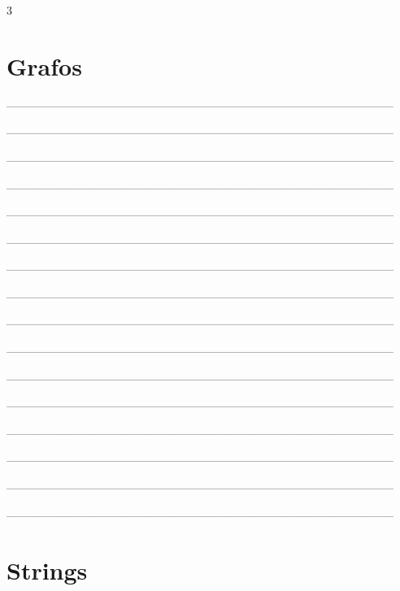 \documentclass[10pt,landscape,oneside,openany,a4paper,notitlepage]{book}
\begin{document}
\begin{multicols*}{3}
\chapter{Grafos}

------------------------------------------------------------------------------------------------------

------------------------------------------------------------------------------------------------------

------------------------------------------------------------------------------------------------------

------------------------------------------------------------------------------------------------------

------------------------------------------------------------------------------------------------------

------------------------------------------------------------------------------------------------------

------------------------------------------------------------------------------------------------------

------------------------------------------------------------------------------------------------------

------------------------------------------------------------------------------------------------------

------------------------------------------------------------------------------------------------------

------------------------------------------------------------------------------------------------------

------------------------------------------------------------------------------------------------------

------------------------------------------------------------------------------------------------------


------------------------------------------------------------------------------------------------------

------------------------------------------------------------------------------------------------------

------------------------------------------------------------------------------------------------------



\chapter{Strings}








\end{multicols*}
\end{document}
